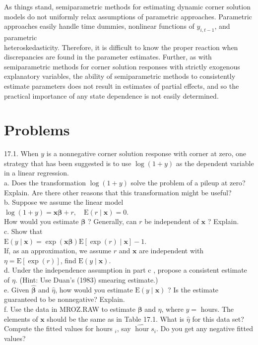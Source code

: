 \documentclass[10pt]{article}
\begin{document}
As things stand, semiparametric methods for estimating dynamic corner solution models do not uniformly relax assumptions of parametric approaches. Parametric approaches easily handle time dummies, nonlinear functions of $y_{i, t-1}$, and parametric\\
heteroskedasticity. Therefore, it is difficult to know the proper reaction when discrepancies are found in the parameter estimates. Further, as with semiparametric methods for corner solution responses with strictly exogenous explanatory variables, the ability of semiparametric methods to consistently estimate parameters does not result in estimates of partial effects, and so the practical importance of any state dependence is not easily determined.

\section*{Problems}
17.1. When $y$ is a nonnegative corner solution response with corner at zero, one strategy that has been suggested is to use $\log (1+y)$ as the dependent variable in a linear regression.\\
a. Does the transformation $\log (1+y)$ solve the problem of a pileup at zero? Explain. Are there other reasons that this transformation might be useful?\\
b. Suppose we assume the linear model\\
$\log (1+y)=\mathbf{x} \boldsymbol{\beta}+r, \quad \mathrm{E}(r \mid \mathbf{x})=0$.\\
How would you estimate $\boldsymbol{\beta}$ ? Generally, can $r$ be independent of $\mathbf{x}$ ? Explain.\\
c. Show that\\
$\mathrm{E}(y \mid \mathbf{x})=\exp (\mathbf{x} \boldsymbol{\beta}) \mathrm{E}[\exp (r) \mid \mathbf{x}]-1$.\\
If, as an approximation, we assume $r$ and $\mathbf{x}$ are independent with $\eta=\mathrm{E}[\exp (r)]$, find $\mathrm{E}(y \mid \mathbf{x})$.\\
d. Under the independence assumption in part c , propose a consistent estimate of $\eta$. (Hint: Use Duan's (1983) smearing estimate.)\\
e. Given $\hat{\boldsymbol{\beta}}$ and $\hat{\eta}$, how would you estimate $\mathrm{E}(y \mid \mathbf{x})$ ? Is the estimate guaranteed to be nonnegative? Explain.\\
f. Use the data in MROZ.RAW to estimate $\boldsymbol{\beta}$ and $\eta$, where $y=$ hours. The elements of $\mathbf{x}$ should be the same as in Table 17.1. What is $\hat{\eta}$ for this data set? Compute the fitted values for hours ${ }_{i}$, say $\widehat{\operatorname{hour}} s_{i}$. Do you get any negative fitted values?\\
\end{document}
